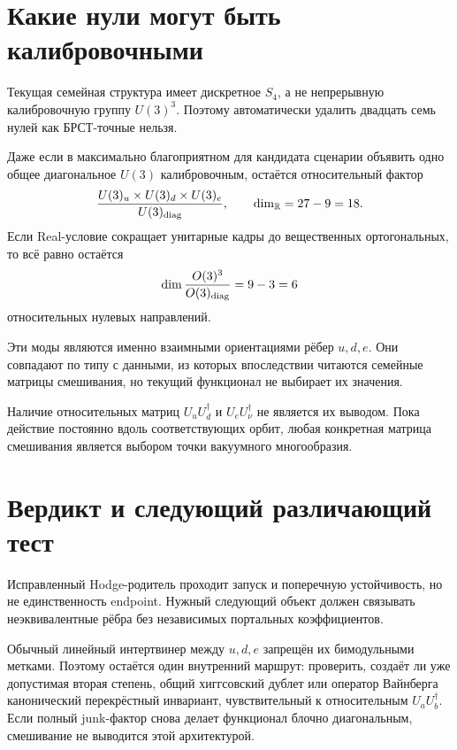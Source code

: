 \section{Какие нули могут быть калибровочными}

Текущая семейная структура имеет дискретное $S_4$, а не непрерывную
калибровочную группу $U(3)^3$. Поэтому автоматически удалить двадцать семь
нулей как БРСТ-точные нельзя.

Даже если в максимально благоприятном для кандидата сценарии объявить одно
общее диагональное $U(3)$ калибровочным, остаётся относительный фактор
\begin{equation}
 \frac{U(3)_u\times U(3)_d\times U(3)_e}{U(3)_{\rm diag}},
 \qquad
 \dim_{\mathbb R}=27-9=18.
 \label{eq:v7-relative-unitary-moduli}
\end{equation}
Если Real-условие сокращает унитарные кадры до вещественных ортогональных,
то всё равно остаётся
\begin{equation}
 \dim\frac{O(3)^3}{O(3)_{\rm diag}}=9-3=6
 \label{eq:v7-relative-real-moduli}
\end{equation}
относительных нулевых направлений.

Эти моды являются именно взаимными ориентациями рёбер $u,d,e$. Они
совпадают по типу с данными, из которых впоследствии читаются семейные
матрицы смешивания, но текущий функционал не выбирает их значения.

\begin{nogocriterion}
Наличие относительных матриц $U_uU_d^\dagger$ и $U_eU_\nu^\dagger$ не
является их выводом. Пока действие постоянно вдоль соответствующих орбит,
любая конкретная матрица смешивания является выбором точки вакуумного
многообразия.
\end{nogocriterion}

\section{Вердикт и следующий различающий тест}

Исправленный Hodge-родитель проходит запуск и поперечную устойчивость, но не
единственность endpoint. Нужный следующий объект должен связывать
неэквивалентные рёбра без независимых портальных коэффициентов.

Обычный линейный интертвинер между $u,d,e$ запрещён их бимодульными метками.
Поэтому остаётся один внутренний маршрут: проверить, создаёт ли уже
допустимая вторая степень, общий хиггсовский дублет или оператор Вайнберга
канонический перекрёстный инвариант, чувствительный к относительным
$U_aU_b^\dagger$. Если полный junk-фактор снова делает функционал блочно
диагональным, смешивание не выводится этой архитектурой.

